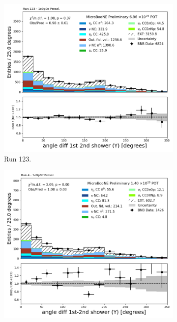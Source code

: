 \begin{figure}[H]
    \centering
    \begin{subfigure}[t]{0.32\linewidth}
        \includegraphics[width=\linewidth]{technote/Appendix_Preselection/Figures/1e0p0pi/Run123/anglediff_Y_Run123_1e0p0pi_Presel.png}
        \caption{Run 123.}
    \end{subfigure}%
    \hspace{0.2cm}%
    \begin{subfigure}[t]{0.32\linewidth}
        \includegraphics[width=\linewidth]{technote/Appendix_Preselection/Figures/1e0p0pi/Run4b/anglediff_Y_Run4b_1e0p0pi_Presel.png}

\end{subfigure}
\end{figure}
